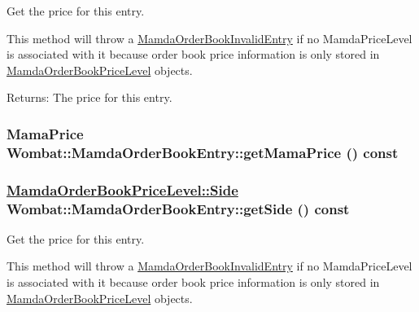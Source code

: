 Get the price for this entry. 

This method will throw a \hyperlink{classWombat_1_1MamdaOrderBookInvalidEntry}{Mamda\-Order\-Book\-Invalid\-Entry} if no Mamda\-Price\-Level is associated with it because order book price information is only stored in \hyperlink{classWombat_1_1MamdaOrderBookPriceLevel}{Mamda\-Order\-Book\-Price\-Level} objects.

\begin{Desc}
\item[Returns:]The price for this entry. \end{Desc}
\hypertarget{classWombat_1_1MamdaOrderBookEntry_c80d40d8f66442d7c61ec41c6da43400}{
\subsubsection[getMamaPrice]{\setlength{\rightskip}{0pt plus 5cm}Mama\-Price Wombat::Mamda\-Order\-Book\-Entry::get\-Mama\-Price () const}}
\label{classWombat_1_1MamdaOrderBookEntry_c80d40d8f66442d7c61ec41c6da43400}


\hypertarget{classWombat_1_1MamdaOrderBookEntry_927b3698111419c12f246c8772e7524c}{
\subsubsection[getSide]{\setlength{\rightskip}{0pt plus 5cm}\hyperlink{classWombat_1_1MamdaOrderBookPriceLevel_384c34b0a74d874b8969dee9b0d3718d}{Mamda\-Order\-Book\-Price\-Level::Side} Wombat::Mamda\-Order\-Book\-Entry::get\-Side () const}}
\label{classWombat_1_1MamdaOrderBookEntry_927b3698111419c12f246c8772e7524c}


Get the price for this entry. 

This method will throw a \hyperlink{classWombat_1_1MamdaOrderBookInvalidEntry}{Mamda\-Order\-Book\-Invalid\-Entry} if no Mamda\-Price\-Level is associated with it because order book price information is only stored in \hyperlink{classWombat_1_1MamdaOrderBookPriceLevel}{Mamda\-Order\-Book\-Price\-Level} objects.

